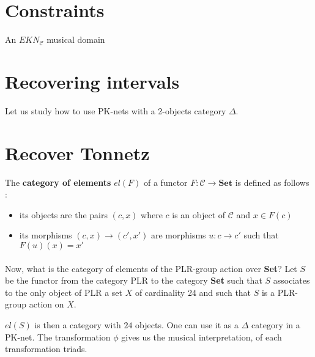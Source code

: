 \documentclass{report}
\begin{document}
\section{Constraints}

\begin{defn}[EK-domain]
    An $EKN_\mathcal{C}$ musical domain
\end{defn}

\begin{defn}

\end{defn}


\section{Recovering intervals}

Let us study how to use PK-nets with a 2-objects category $\Delta$.






\section{Recover Tonnetz}


\begin{defn} The \textbf{category of elements} $el(F)$ of a functor $F : \mathcal{C}\rightarrow \textbf{Set}$ is defined as follows :
    \begin{itemize}
        \item its objects are the pairs $(c,x)$ where $c$ is an object of $\mathcal{C}$ and $x\in F(c)$
        \item its morphisms $(c,x)\rightarrow (c',x')$ are morphisms $u : c\rightarrow c'$ such that $F(u)(x) = x'$
    \end{itemize}
\end{defn}
\paragraph{}
Now, what is the category of elements of the PLR-group action over \textbf{Set}? Let $S$ be the functor from the category PLR to the category \textbf{Set} such that $S$ associates to the only object of PLR a set $X$ of cardinality 24 and such that $S$ is a PLR-group action on $X$.

$el(S)$ is then a category with $24$ objects. One can use it as a $\Delta$ category in a PK-net. The transformation $\phi$ gives us the musical interpretation, of each transformation triads.
\end{document}
